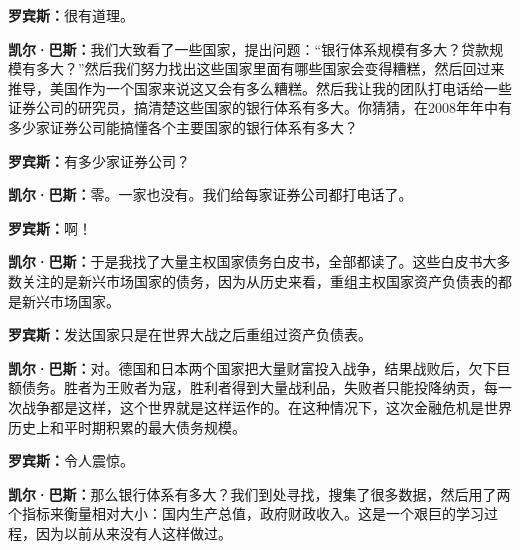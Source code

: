 \begin{BookQuote}
\textbf{罗宾斯：}很有道理。
\end{BookQuote}

\begin{BookQuote}
\textbf{凯尔·巴斯：}我们大致看了一些国家，提出问题：“银行体系规模有多大？贷款规模有多大？”然后我们努力找出这些国家里面有哪些国家会变得糟糕，然后回过来推导，美国作为一个国家来说这又会有多么糟糕。然后我让我的团队打电话给一些证券公司的研究员，搞清楚这些国家的银行体系有多大。你猜猜，在2008年年中有多少家证券公司能搞懂各个主要国家的银行体系有多大？
\end{BookQuote}

\begin{BookQuote}
\textbf{罗宾斯：}有多少家证券公司？
\end{BookQuote}

\begin{BookQuote}
\textbf{凯尔·巴斯：}零。一家也没有。我们给每家证券公司都打电话了。
\end{BookQuote}

\begin{BookQuote}
\textbf{罗宾斯：}啊！
\end{BookQuote}

\begin{BookQuote}
\textbf{凯尔·巴斯：}于是我找了大量主权国家债务白皮书，全部都读了。这些白皮书大多数关注的是新兴市场国家的债务，因为从历史来看，重组主权国家资产负债表的都是新兴市场国家。
\end{BookQuote}

\begin{BookQuote}
\textbf{罗宾斯：}发达国家只是在世界大战之后重组过资产负债表。
\end{BookQuote}

\begin{BookQuote}
\textbf{凯尔·巴斯：}对。德国和日本两个国家把大量财富投入战争，结果战败后，欠下巨额债务。胜者为王败者为寇，胜利者得到大量战利品，失败者只能投降纳贡，每一次战争都是这样，这个世界就是这样运作的。在这种情况下，这次金融危机是世界历史上和平时期积累的最大债务规模。
\end{BookQuote}

\begin{BookQuote}
\textbf{罗宾斯：}令人震惊。
\end{BookQuote}

\begin{BookQuote}
\textbf{凯尔·巴斯：}那么银行体系有多大？我们到处寻找，搜集了很多数据，然后用了两个指标来衡量相对大小：国内生产总值，政府财政收入。这是一个艰巨的学习过程，因为以前从来没有人这样做过。
\end{BookQuote}

